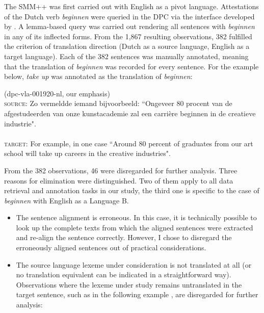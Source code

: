 The SMM++ was first carried out with English as a pivot language. Attestations of the Dutch verb \textit{beginnen} were queried in the DPC via the interface developed by \citet[62]{delaere_translations_2015}. A lemma-based query was carried out rendering all sentences with \textit{beginnen} in any of its inflected forms. From the 1,867 resulting observations, 382 fulfilled the criterion of translation direction (Dutch as a source language, English as a target language). Each of the 382 sentences was manually annotated, meaning that the translation of \textit{beginnen} was recorded for every sentence. For the example  below, \textit{take} \textit{up} was annotated as the translation of \textit{beginnen}:


\ea (dpc-vla-001920-nl, our emphasis)\label{ex:3:1}\\
\textsc{source:} Zo vermeldde iemand bijvoorbeeld: “Ongeveer 80 procent van de afgestudeerden van onze kunstacademie zal een carrière beginnen in de creatieve industrie".\\\\
{\scshape target:} For example, in one case “Around 80 percent of graduates from our art school will take up careers in the creative industries". 
\z

From the 382 observations, 46 were disregarded for further analysis. Three reasons for elimination were distinguished. Two of them apply to all data retrieval and annotation tasks in our study, the third one is specific to the case of \textit{beginnen} with English as a Language B.

\begin{itemize}
\item 
The sentence alignment is erroneous. In this case, it is technically possible to look up the complete texts from which the aligned sentences were extracted and re-align the sentence correctly. However, I chose to disregard the erroneously aligned sentences out of practical considerations.
\item 
The source language lexeme under consideration is not translated at all (or no translation equivalent can be indicated in a straightforward way). Observations where the lexeme under study remains untranslated in the target sentence, such as in the following example , are disregarded for further analysis:
\end{itemize}


